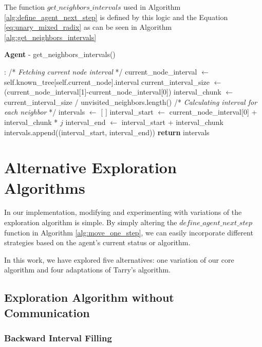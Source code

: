 The function $get\_neighbors\_intervals$ used in Algorithm \ref{alg:define_agent_next_step}
is defined by this logic and the Equation \ref{eq:unary_mixed_radix} as can be seen in Algorithm \ref{alg:get_neighbors_intervals}

\begin{algorithm}
\caption{\textbf{Agent} - get\_neighbors\_intervals()}
\label{alg:get_neighbors_intervals}
\begin{algorithmic}
    :
    \State /* \textit{Fetching current node interval } */
    \State current\_node\_interval $\gets$ self.known\_tree[self.current\_node].interval
    \State current\_interval\_size $\gets$ (current\_node\_interval[1]-current\_node\_interval[0])
    \State interval\_chunk $\gets$ current\_interval\_size / unvisited\_neighbors.length()
    \State
    \State /* \textit{Calculating interval for each neighbor} */
    \State intervals $\gets$ $[$ $ ]$
        \State interval\_start $\gets$ current\_node\_interval[0] + interval\_chunk * $j$
        \State interval\_end $\gets$ interval\_start + interval\_chunk
        \State intervals.append((interval\_start, interval\_end))
    \EndFor
    \State \textbf{return} intervals
    \EndProcedure
\end{algorithmic}
\end{algorithm}


\section{Alternative Exploration Algorithms}
\label{section_method_alt_exploration_alg}

In our implementation, modifying and experimenting with variations of the exploration algorithm is simple.
By simply altering the $define\_agent\_next\_step$ function in Algorithm \ref{alg:move_one_step}, we can easily incorporate different strategies based on the agent's current status or algorithm.

In this work, we have explored five alternatives: one variation of our core algorithm and four adaptations of Tarry's algorithm.

\subsection{Exploration Algorithm without Communication}
\label{section_method_zero_comm}

\subsubsection{Backward Interval Filling}
\label{section_backward_interval}

